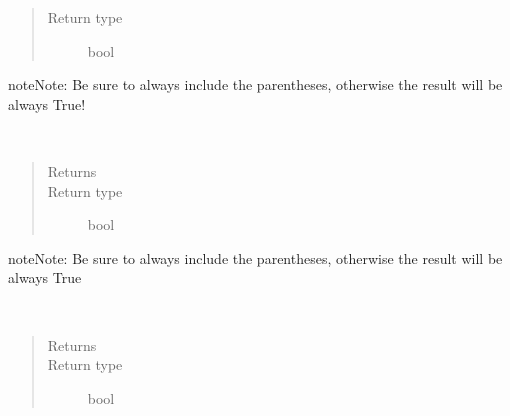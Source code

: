 \documentclass[letterpaper,10pt,english]{sphinxmanual}
\begin{document}
\begin{fulllineitems}
\begin{fulllineitems}
\begin{quote}
\begin{description}
\item[{Return type}] \leavevmode
bool

\end{description}\end{quote}

\begin{sphinxadmonition}{note}{Note:}
Be sure to always include the parentheses, otherwise the result will be always True!
\end{sphinxadmonition}

\end{fulllineitems}


\begin{fulllineitems}
\label{\detokenize{Reference:salabim.Component.isstandby}}~\begin{quote}\begin{description}
\item[{Returns}] \leavevmode
{}

\item[{Return type}] \leavevmode
bool

\end{description}\end{quote}

\begin{sphinxadmonition}{note}{Note:}
Be sure to always include the parentheses, otherwise the result will be always True
\end{sphinxadmonition}

\end{fulllineitems}


\begin{fulllineitems}
\label{\detokenize{Reference:salabim.Component.iswaiting}}~\begin{quote}\begin{description}
\item[{Returns}] \leavevmode
{}

\item[{Return type}] \leavevmode
bool

\end{description}\end{quote}


\end{fulllineitems}
\end{fulllineitems}
\end{document}
